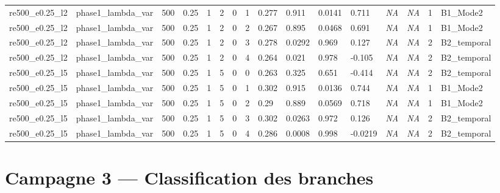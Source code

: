 \documentclass[11pt,a4paper]{article}
\begin{document}
\begin{landscape}
\begin{longtable}{*{16}{l}}
    re500\_e0.25\_l2 & phase1\_lambda\_var & 500 & 0.25 & 1 & 2 & 0 & 1 & 0.277 & 0.911 & 0.0141 & 0.711 & \textit{NA} & \textit{NA} & 1 & B1\_Mode2 \\
    re500\_e0.25\_l2 & phase1\_lambda\_var & 500 & 0.25 & 1 & 2 & 0 & 2 & 0.267 & 0.895 & 0.0468 & 0.691 & \textit{NA} & \textit{NA} & 1 & B1\_Mode2 \\
    re500\_e0.25\_l2 & phase1\_lambda\_var & 500 & 0.25 & 1 & 2 & 0 & 3 & 0.278 & 0.0292 & 0.969 & 0.127 & \textit{NA} & \textit{NA} & 2 & B2\_temporal \\
    re500\_e0.25\_l2 & phase1\_lambda\_var & 500 & 0.25 & 1 & 2 & 0 & 4 & 0.264 & 0.021 & 0.978 & -0.105 & \textit{NA} & \textit{NA} & 2 & B2\_temporal \\
    re500\_e0.25\_l5 & phase1\_lambda\_var & 500 & 0.25 & 1 & 5 & 0 & 0 & 0.263 & 0.325 & 0.651 & -0.414 & \textit{NA} & \textit{NA} & 2 & B2\_temporal \\
    re500\_e0.25\_l5 & phase1\_lambda\_var & 500 & 0.25 & 1 & 5 & 0 & 1 & 0.302 & 0.915 & 0.0136 & 0.744 & \textit{NA} & \textit{NA} & 1 & B1\_Mode2 \\
    re500\_e0.25\_l5 & phase1\_lambda\_var & 500 & 0.25 & 1 & 5 & 0 & 2 & 0.29 & 0.889 & 0.0569 & 0.718 & \textit{NA} & \textit{NA} & 1 & B1\_Mode2 \\
    re500\_e0.25\_l5 & phase1\_lambda\_var & 500 & 0.25 & 1 & 5 & 0 & 3 & 0.302 & 0.0263 & 0.972 & 0.126 & \textit{NA} & \textit{NA} & 2 & B2\_temporal \\
    re500\_e0.25\_l5 & phase1\_lambda\_var & 500 & 0.25 & 1 & 5 & 0 & 4 & 0.286 & 0.0008 & 0.998 & -0.0219 & \textit{NA} & \textit{NA} & 2 & B2\_temporal \\
    \end{longtable}
\endgroup
\end{landscape}


\section{Campagne 3 --- Classification des branches}
\end{document}
